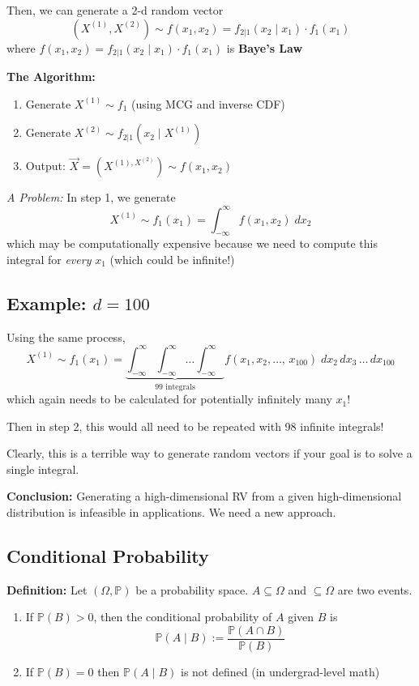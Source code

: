 \documentclass[12pt]{article}
\renewcommand{\P}{\mathbb{P}}
\begin{document}
Then, we can generate a 2-d random vector 
\[(X^{(1)}, X^{(2)}) \sim f(x_1, x_2) = f_{2|1}(x_2 \; | \;x_1) \cdot f_1(x_1)\]
where $f(x_1, x_2) = f_{2 |1}(x_2 \; | \;x_1) \cdot f_1(x_1)$ is \textbf{Baye's Law}

\textbf{The Algorithm:}
\begin{enumerate}
    \item Generate $X^{(1)} \sim f_1$ (using MCG and inverse CDF)
    \item Generate $X^{(2)} \sim f_{2 | 1}(x_2 \; | \; X^{(1)})$
    \item Output: $\vec X = (X^{(1), X^{(2)}}) \sim f(x_1, x_2)$
\end{enumerate}

\emph{A Problem:} In step 1, we generate 
\[X^{(1)} \sim f_1(x_1) = \int_{-\infty}^{\infty} f(x_1, x_2)\; dx_2\]
which may be computationally expensive because we need to compute this integral for \emph{every} $x_1$ (which could be infinite!)

\subsection*{Example: $d = 100$}
Using the same process, 
\[X^{(1)} \sim f_1(x_1) = \underbrace{\int_{-\infty}^{\infty} \int_{-\infty}^{\infty} \dots \int_{-\infty}^{\infty}}_{\text{99 integrals}} f(x_1, x_2, \dots,\, x_{100})\; dx_2\, dx_3\, \dots\, dx_{100}\]
which again needs to be calculated for potentially infinitely many $x_1$!

Then in step 2, this would all need to be repeated with 98 infinite integrals!

Clearly, this is a terrible way to generate random vectors if your goal is to solve a single integral.

\textbf{Conclusion:} Generating a high-dimensional RV from a given high-dimensional distribution is infeasible in applications. We need a new approach. 

\subsection*{Conditional Probability}
\textbf{Definition:} Let $(\Omega, \P)$ be a probability space. $A \subseteq \Omega$ and $\subseteq \Omega$ are two events.
\begin{enumerate}
    \item If $\P(B) > 0$, then the conditional probability of $A$ given $B$ is 
    \[\P(A \; | \; B) := \frac{\P(A \cap B)}{\P(B)}\]
    \item If $\P(B) = 0$ then $\P(A \; | \; B)$ is not defined (in undergrad-level math)
\end{enumerate}
\end{document}

